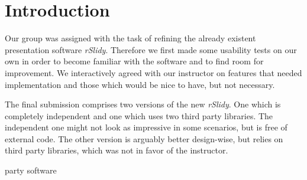%
%
% 
% 
% 


\chapter{Introduction}

\label{chap:Intro}

Our group was assigned with the task of refining the already existent 
presentation software \textit{rSlidy}. Therefore we first made some usability 
tests on our own in order to become familiar with the software and to find room 
for improvement. We interactively agreed with our instructor on features that 
needed implementation and those which would be nice to have, but not necessary.

The final submission comprises two versions of the new \textit{rSlidy}. One 
which is completely independent and one which uses two third party libraries. 
The independent one might not look as impressive in some scenarios, but is free 
of external code. The other version is arguably better design-wise, but relies 
on third party libraries, which was not in favor of the instructor. 

party software